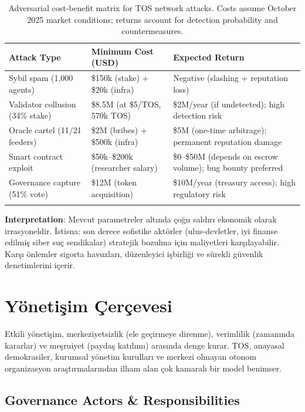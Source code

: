 \documentclass[11pt]{article}
\begin{document}
\begin{itemize}[noitemsep]
\begin{itemize}[noitemsep]
\begin{itemize}[noitemsep]
\begin{itemize}[noitemsep]
\begin{itemize}[noitemsep]
\begin{itemize}[noitemsep]
\begin{itemize}[noitemsep]
\begin{enumerate}[noitemsep]
\begin{itemize}[noitemsep]
\begin{longtable}{@{}p{}p{}p{}@{}}
\toprule
\textbf{Attack Type} & \textbf{Minimum Cost (USD)} & \textbf{Expected Return} \\\midrule
Sybil spam (1,000 agents) & \$150k (stake) + \$20k (infra) & Negative (slashing + reputation loss) \\
Validator collusion (34\% stake) & \$8.5M (at \$5/TOS, 570k TOS) & \$2M/year (if undetected); high detection risk \\
Oracle cartel (11/21 feeders) & \$2M (bribes) + \$500k (infra) & \$5M (one-time arbitrage); permanent reputation damage \\
Smart contract exploit & \$50k--\$200k (researcher salary) & \$0--\$50M (depends on escrow volume); bug bounty preferred \\
Governance capture (51\% vote) & \$12M (token acquisition) & \$10M/year (treasury access); high regulatory risk \\
\bottomrule
\caption{Adversarial cost-benefit matrix for TOS network attacks. Costs assume October 2025 market conditions; returns account for detection probability and countermeasures.}
\end{longtable}

\textbf{Interpretation}: Mevcut parametreler altında çoğu saldırı ekonomik olarak irrasyoneldir. İstisna: son derece sofistike aktörler (ulus-devletler, iyi finanse edilmiş siber suç sendikalar) stratejik bozulma için maliyetleri karşılayabilir. Karşı önlemler sigorta havuzları, düzenleyici işbirliği ve sürekli güvenlik denetimlerini içerir.

\section{Yönetişim Çerçevesi}
\label{sec:governance}

Etkili yönetişim, merkeziyetsizlik (ele geçirmeye direnme), verimlilik (zamanında kararlar) ve meşruiyet (paydaş katılımı) arasında denge kurar. TOS, anayasal demokrasiler, kurumsal yönetim kurulları ve merkezi olmayan otonom organizasyon araştırmalarından ilham alan çok kamaralı bir model benimser.

\subsection{Governance Actors \& Responsibilities}


\end{itemize}
\end{enumerate}
\end{itemize}
\end{itemize}
\end{itemize}
\end{itemize}
\end{itemize}
\end{itemize}
\end{itemize}
\end{document}
